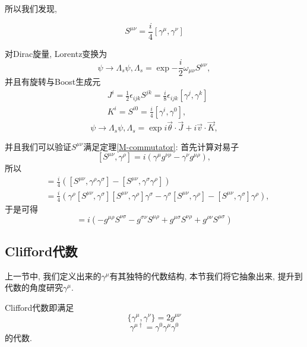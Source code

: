 所以我们发现, 
\begin{definition}[Dirac旋量生成元]
    \begin{equation}
        S^{\mu\nu}=\frac i4[\gamma^\mu, \gamma^\nu]
    \end{equation}
\end{definition}
对Dirac旋量, Lorentz变换为
\begin{equation}
    \psi\to\Lambda_s\psi, \Lambda_s=\exp{-\frac i2\omega_{\mu\nu}S^{\mu\nu}},
\end{equation}
并且有旋转与Boost生成元
\begin{align}
    & J^{i}=\frac12\epsilon_{ijk}S^{jk}=\frac i8\epsilon_{ijk}[\gamma^j, \gamma^k]\\
    & K^i=S^{i0}=\frac i4[\gamma^i, \gamma^0],
\end{align}
\begin{equation}
    \psi\to\Lambda_s\psi, \Lambda_s=\exp{i\vec\theta\cdot\vec J+i\vec v\cdot\vec K},
\end{equation}

并且我们可以验证$S^{\mu\nu}$满足定理\ref{M-commutator}: 首先计算对易子
\begin{equation}\label{S-gamma-commutator}
    [S^{\mu\nu}, \gamma^\rho]=i(\gamma^\mu g^{\nu\rho}-\gamma^\nu g^{\mu\rho}),
\end{equation}
所以
\begin{align}
    [S^{\mu\nu}, S_{\rho\sigma}]&=\frac i4\left([S^{\mu\nu}, \gamma^\rho\gamma^\sigma]-[S^{\mu\nu}, \gamma^\sigma\gamma^\rho]\right)\\
    &=\frac i4\left(\gamma^\rho[S^{\mu\nu}, \gamma^\sigma][S^{\mu\nu}, \gamma^\rho]\gamma^\sigma-\gamma^\sigma[S^{\mu\nu}, \gamma^\rho]-[S^{\mu\nu}, \gamma^\sigma]\gamma^\rho\right),
\end{align}
于是可得
\begin{equation}
    [S^{\mu\nu}, S^{\rho\sigma}]=i(-g^{\mu\rho}S^{\nu\sigma}-g^{\sigma\nu}S^{\mu\rho}+g^{\mu\sigma}S^{\nu\rho}+g^{\rho\nu}S^{\mu\sigma})
\end{equation}

\subsection{Clifford代数\label{clifford}}
上一节中, 我们定义出来的$\gamma^\mu$有其独特的代数结构, 本节我们将它抽象出来, 提升到代数的角度研究$\gamma^\mu$.
\begin{definition}[Clifford代数]
    Clifford代数即满足
    \begin{equation}
        \{\gamma^\mu, \gamma^\nu\}=2g^{\mu\nu}
    \end{equation}
    \begin{equation}
        \gamma^{\mu\dagger}=\gamma^0\gamma^\mu\gamma^0
    \end{equation}
    的代数.
\end{definition}

